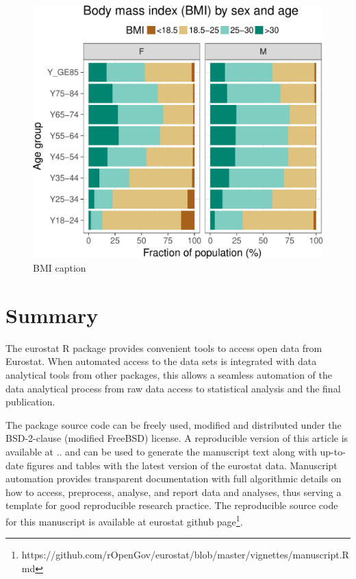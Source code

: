 \begin{figure}
\begin{center}
\includegraphics{2015-manu-bmi-1}
\end{center}
\caption{BMI caption}
\label{fig:bmi}
\end{figure}




\section{Summary}

The eurostat R package provides convenient tools to access open data
from Eurostat. When automated access to the data sets is integrated
with data analytical tools from other packages, this allows a seamless
automation of the data analytical process from raw data access to
statistical analysis and the final publication.

The package source code can be freely used, modified and distributed
under the BSD-2-clause (modified FreeBSD) license. A reproducible
version of this article is available at .. and can be used to generate
the manuscript text along with up-to-date figures and tables with the
latest version of the eurostat data. Manuscript automation provides
transparent documentation with full algorithmic details on how to
access, preprocess, analyse, and report data and analyses, thus
serving a template for good reproducible research practice. The reproducible source code for this manuscript is available at eurostat github page\footnote{https://github.com/rOpenGov/eurostat/blob/master/vignettes/manuscript.Rmd}.

